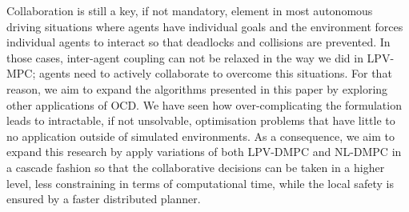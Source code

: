 \documentclass[a4paper,fleqn]{cas-sc}
\begin{document}
Collaboration is still a key, if not mandatory, element in most autonomous driving situations where agents have individual goals and the environment forces individual agents to interact so that deadlocks and collisions are prevented. In those cases, inter-agent coupling can not be relaxed in the way we did in LPV-MPC; agents need to actively collaborate to overcome this situations. For that reason, we aim to expand the algorithms presented in this paper by exploring other applications of OCD. We have seen how over-complicating the formulation leads to intractable, if not unsolvable, optimisation problems that have little to no application outside of simulated environments. As a consequence, we aim to expand this research by apply variations of both LPV-DMPC and NL-DMPC in a cascade fashion so that the collaborative decisions can be taken in a higher level, less constraining in terms of computational time, while the local safety is ensured by a faster distributed planner.




\end{document}
